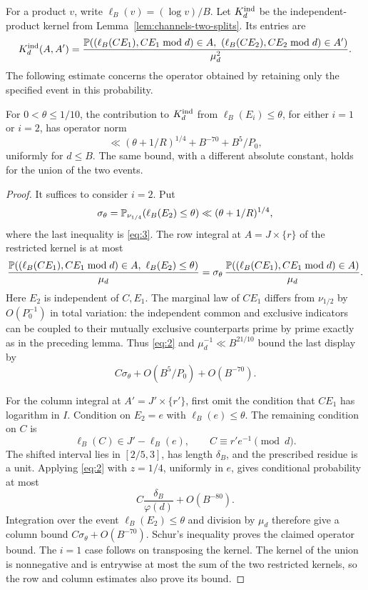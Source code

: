 For a product \(v\), write \(\ell_B(v)=(\log v)/B\).
Let \(K_d^{\rm ind}\) be the independent-product kernel from
Lemma~\ref{lem:channels-two-splits}.
Its entries are
\[
 K_d^{\rm ind}(A,A')
 =\frac{\mathbb P((\ell_B(CE_1),CE_1\bmod d)\in A,\
              (\ell_B(CE_2),CE_2\bmod d)\in A')}{\mu_d^2}.
\]
The following estimate concerns the operator obtained by retaining only
the specified event in this probability.

\begin{lemma}
\label{lem:channels-low-exclusive}
For \(0<\theta\le1/10\), the contribution to \(K_d^{\rm ind}\) from
\(\ell_B(E_i)\le\theta\), for either \(i=1\) or \(i=2\), has operator norm
\[
 \ll (\theta+1/R)^{1/4}+B^{-70}+B^5/P_0,
\]
uniformly for \(d\le B\).  The same bound, with a different absolute
constant, holds for the union of the two events.
\end{lemma}

\begin{proof}
It suffices to consider \(i=2\).  Put
\[
 \sigma_\theta=\mathbb P_{\nu_{1/4}}(\ell_B(E_2)\le\theta)
 \ll(\theta+1/R)^{1/4},
\]
where the last inequality is \eqref{eq:3}.
The row integral at \(A=J\times\{r\}\) of the restricted kernel is at most
\[
 \frac{\mathbb P((\ell_B(CE_1),CE_1\bmod d)\in A,\
                         \ell_B(E_2)\le\theta)}{\mu_d}
 =\sigma_\theta\,
   \frac{\mathbb P((\ell_B(CE_1),CE_1\bmod d)\in A)}{\mu_d}.
\]
Here \(E_2\) is independent of \(C,E_1\).
The marginal law of \(CE_1\) differs from \(\nu_{1/2}\) by
\(O(P_0^{-1})\) in total variation: the independent common and exclusive
indicators can be coupled to their mutually exclusive counterparts
prime by prime exactly as in the preceding lemma.  Thus \eqref{eq:2}
and \(\mu_d^{-1}\ll B^{21/10}\) bound the last display by
\[
 C\sigma_\theta+O(B^5/P_0)+O(B^{-70}).
\]

For the column integral at \(A'=J'\times\{r'\}\), first omit the condition
that \(CE_1\) has logarithm in \(I\).  Condition on \(E_2=e\) with
\(\ell_B(e)\le\theta\).  The remaining condition on \(C\) is
\[
 \ell_B(C)\in J'-\ell_B(e),\qquad
 C\equiv r'e^{-1}\pmod d.
\]
The shifted interval lies in \([2/5,3]\), has length \(\delta_B\),
and the prescribed residue is a unit.  Applying \eqref{eq:2} with
\(z=1/4\), uniformly in \(e\), gives conditional probability at most
\[
 C\frac{\delta_B}{\varphi(d)}+O(B^{-80}).
\]
Integration over the event \(\ell_B(E_2)\le\theta\) and division by
\(\mu_d\) therefore give a column bound \(C\sigma_\theta+O(B^{-70})\).
Schur's inequality proves the claimed operator bound.
The \(i=1\) case follows on transposing the kernel.  The kernel of the
union is nonnegative and is entrywise at most the sum of the two
restricted kernels, so the row and column estimates also prove its bound.
\end{proof}

